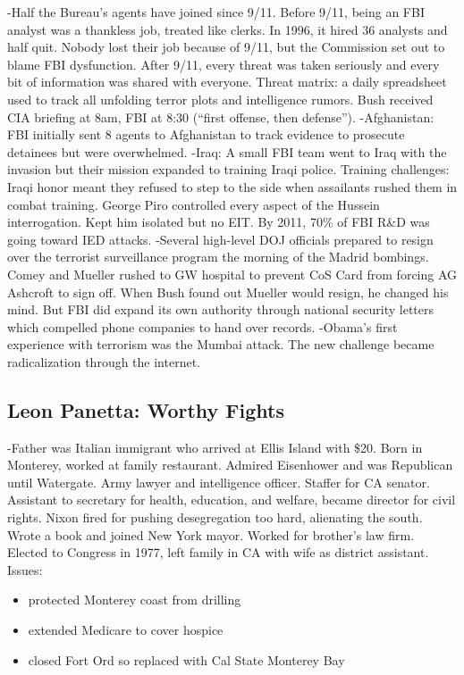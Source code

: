 \documentclass[
]{article}
\begin{document}
-Half the Bureau's agents have joined since 9/11. Before 9/11, being an
FBI analyst was a thankless job, treated like clerks. In 1996, it hired
36 analysts and half quit. Nobody lost their job because of 9/11, but
the Commission set out to blame FBI dysfunction. After 9/11, every
threat was taken seriously and every bit of information was shared with
everyone. Threat matrix: a daily spreadsheet used to track all unfolding
terror plots and intelligence rumors. Bush received CIA briefing at 8am,
FBI at 8:30 (``first offense, then defense''). -Afghanistan: FBI
initially sent 8 agents to Afghanistan to track evidence to prosecute
detainees but were overwhelmed. -Iraq: A small FBI team went to Iraq
with the invasion but their mission expanded to training Iraqi police.
Training challenges: Iraqi honor meant they refused to step to the side
when assailants rushed them in combat training. George Piro controlled
every aspect of the Hussein interrogation. Kept him isolated but no EIT.
By 2011, 70\% of FBI R\&D was going toward IED attacks. -Several
high-level DOJ officials prepared to resign over the terrorist
surveillance program the morning of the Madrid bombings. Comey and
Mueller rushed to GW hospital to prevent CoS Card from forcing AG
Ashcroft to sign off. When Bush found out Mueller would resign, he
changed his mind. But FBI did expand its own authority through national
security letters which compelled phone companies to hand over records.
-Obama's first experience with terrorism was the Mumbai attack. The new
challenge became radicalization through the internet.

\hypertarget{leon-panetta-worthy-fights}{%
\subsection{Leon Panetta: Worthy
Fights}\label{leon-panetta-worthy-fights}}

-Father was Italian immigrant who arrived at Ellis Island with \$20.
Born in Monterey, worked at family restaurant. Admired Eisenhower and
was Republican until Watergate. Army lawyer and intelligence officer.
Staffer for CA senator. Assistant to secretary for health, education,
and welfare, became director for civil rights. Nixon fired for pushing
desegregation too hard, alienating the south. Wrote a book and joined
New York mayor. Worked for brother's law firm. Elected to Congress in
1977, left family in CA with wife as district assistant. Issues:

\begin{itemize}
\item
  protected Monterey coast from drilling
\item
  extended Medicare to cover hospice
\item
  closed Fort Ord so replaced with Cal State Monterey Bay
\end{itemize}
\end{document}
